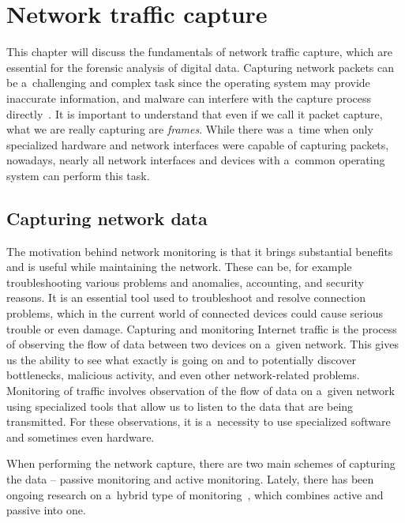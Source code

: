 \documentclass[
  printed,     %
  color,       %
  oneside,     %
  nosansbold,  %
  nocolorbold, %
  nolof,         %
  nolot,         %
]{fithesis4}
\begin{document}
\newpage
\chapter{Network traffic capture}
\label{chap:ntc}

This chapter will discuss the fundamentals of network traffic capture, which are essential for the forensic analysis of digital data. Capturing network packets can be a~challenging and complex task since the operating system may provide inaccurate information, and malware can interfere with the capture process directly~\cite{Messier2017-fz}. It is important to understand that even if we call it packet capture, what we are really capturing are \textit{frames}. While there was a~time when only specialized hardware and network interfaces were capable of capturing packets, nowadays, nearly all network interfaces and devices with a~common operating system can perform this task.


\section{Capturing network data}

The motivation behind network monitoring is that it brings substantial benefits and is useful while maintaining the network. These can be, for example troubleshooting various problems and anomalies, accounting, and security reasons. It is an essential tool used to troubleshoot and resolve connection problems, which in the current world of connected devices could cause serious trouble or even damage. Capturing and monitoring Internet traffic is the process of observing the flow of data between two devices on a~given network. This gives us the ability to see what exactly is going on and to potentially discover bottlenecks, malicious activity, and even other network-related problems. Monitoring of traffic involves observation of the flow of data on a~given network using specialized tools that allow us to listen to the data that are being transmitted. For these observations, it is a~necessity to use specialized software and sometimes even hardware.

When performing the network capture, there are two main schemes of capturing the data -- passive monitoring and active monitoring. Lately, there has been ongoing research on a~hybrid type of monitoring~\cite{261437}, which combines active and passive into one.
\end{document}
